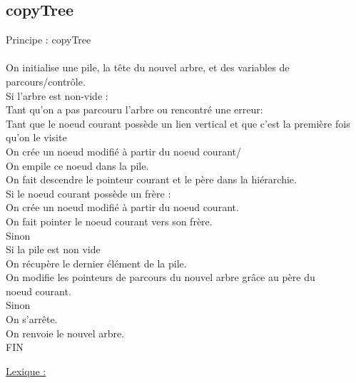\documentclass[a4paper]{article}
\newcommand\tab[1][1cm]{\hspace*{#1}}
\begin{document}
\subsection{copyTree}
\begin{algorithm}
Principe : copyTree 
\\
\\
\tab On initialise une pile, la tête du nouvel arbre, et des variables de parcours/contrôle.
\\
\tab Si l'arbre est non-vide :
\\
\tab \tab Tant qu'on a pas parcouru l'arbre ou rencontré une erreur:
\\
\tab \tab \tab Tant que le noeud courant possède un lien vertical et que c'est la première fois qu'on le visite
\\
\tab \tab \tab \tab On crée un noeud modifié à partir du noeud courant/
\\
\tab \tab \tab \tab On empile ce noeud dans la pile.
\\
\tab \tab \tab \tab On fait descendre le pointeur courant et le père dans la hiérarchie.
\\
\tab \tab \tab Si le noeud courant possède un frère :
\\
\tab \tab \tab \tab On crée un noeud modifié à partir du noeud courant.
\\
\tab \tab \tab \tab On fait pointer le noeud courant vers son frère.
\\
\tab \tab \tab Sinon
\\
\tab \tab \tab \tab Si la pile est non vide
\\
\tab \tab \tab \tab \tab On récupère le dernier élément de la pile.
\\
\tab \tab \tab \tab \tab On modifie les pointeurs de parcours du nouvel arbre grâce au père du 
\\
\tab \tab \tab \tab \tab noeud courant.
\\ 
\tab \tab \tab \tab Sinon
\\ 
\tab \tab \tab \tab \tab On s'arrête.
\\
\tab On renvoie le nouvel arbre.
\\
FIN
\end{algorithm}
\underline{Lexique :}
\end{document}
